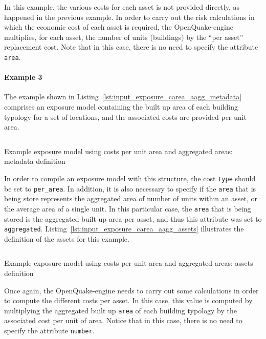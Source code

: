 In this example, the various costs for each asset is not provided directly, as
happened in the previous example. In order to carry out the risk calculations
in which the economic cost of each asset is required, the OpenQuake-engine
multiplies, for each asset, the number of units (buildings) by the ``per
asset'' replacement cost. Note that in this case, there is no need to specify
the attribute \Verb+area+.


\paragraph{Example 3}

The example shown in Listing~\ref{lst:input_exposure_carea_aagg_metadata}
comprises an \gls{exposure model} containing the built up area of each
building typology for a set of locations, and the associated costs are
provided per unit area.

\begin{listing}[htbp]
  \inputminted[firstline=8,firstnumber=8,lastline=20,fontsize=\footnotesize,frame=single,linenos,bgcolor=lightgray]{xml}{oqum/risk/Verbatim/input_exposure_carea_aagg.xml}
  \caption{Example exposure model using costs per unit area and aggregated areas: metadata definition}
  \label{lst:input_exposure_carea_aagg_metadata}
\end{listing}

In order to compile an \gls{exposure model} with this structure, the cost
\Verb+type+ should be set to \Verb+per_area+. In addition, it is also
necessary to specify if the \Verb+area+ that is being store represents the
aggregated area of number of units within an asset, or the average area of a
single unit. In this particular case, the \Verb+area+ that is being stored is
the aggregated built up area per asset, and thus this attribute was set to
\Verb+aggregated+. Listing~\ref{lst:input_exposure_carea_aagg_assets}
illustrates the definition of the assets for this example.

\begin{listing}[htbp]
  \inputminted[firstline=21,firstnumber=21,lastline=31,fontsize=\footnotesize,frame=single,linenos,bgcolor=lightgray]{xml}{oqum/risk/Verbatim/input_exposure_carea_aagg.xml}
  \caption{Example exposure model using costs per unit area and aggregated areas: assets definition}
  \label{lst:input_exposure_carea_aagg_assets}
\end{listing}

Once again, the OpenQuake-engine needs to carry out some calculations in order
to compute the different costs per asset. In this case, this value is computed
by multiplying the aggregated built up \Verb+area+ of each building typology
by the associated cost per unit of area. Notice that in this case, there is no
need to specify the attribute \Verb+number+.


